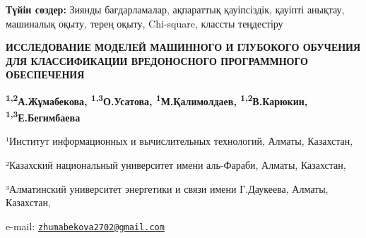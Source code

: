 {\bfseries Түйін сөздер:} Зиянды бағдарламалар, ақпараттық қауіпсіздік,
қауіпті анықтау, машиналық оқыту, терең оқыту, Chi-square, классты
теңдестіру

\begin{articleheader}
{\bfseries ИССЛЕДОВАНИЕ МОДЕЛЕЙ МАШИННОГО И ГЛУБОКОГО ОБУЧЕНИЯ ДЛЯ
КЛАССИФИКАЦИИ ВРЕДОНОСНОГО ПРОГРАММНОГО ОБЕСПЕЧЕНИЯ}

{\bfseries \textsuperscript{1,2}А.Жұмабекова\textsuperscript{\envelope },
\textsuperscript{1,3}О.Усатова, \textsuperscript{1}М.Қалимолдаев,
\textsuperscript{1,2}В.Карюкин, \textsuperscript{1,3}Е.Бегимбаева}
\end{articleheader}

\begin{affiliation}
¹Институт информационных и вычислительных технологий, Алматы, Казахстан,

²Казахский национальный университет имени аль-Фараби, Алматы, Казахстан,

³Алматинский университет энергетики и связи имени Г.Даукеева, Алматы, Казахстан,

e-mail: \href{mailto:zhumabekova2702@gmail.com}{\nolinkurl{zhumabekova2702@gmail.com}}
\end{affiliation}

